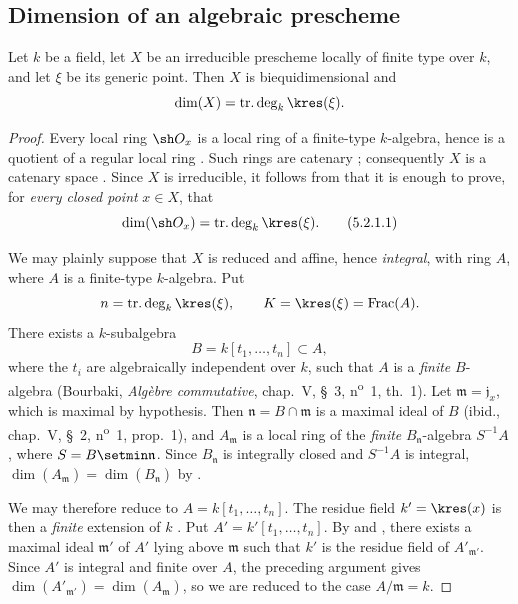 \subsection{Dimension of an algebraic prescheme}
\label{subsection:IV.5.2}


\begin{proposition}[5.2.1]
\label{IV.5.2.1}
Let $k$ be a field, let $X$ be an irreducible prescheme locally of
finite type over $k$, and let $\xi$ be its generic point.
Then $X$ is biequidimensional and
\[
\dim(X)=\operatorname{tr.deg}_k\kres(\xi).
\]
\end{proposition}

\begin{proof}
Every local ring $\sh O_x$ is a local ring of a finite-type
$k$-algebra, hence is a quotient of a regular local ring
.
Such rings are catenary ; consequently $X$ is a
catenary space .
Since $X$ is irreducible, it follows from  that it is
enough to prove, for \emph{every closed point} $x\in X$, that
\begin{equation}
\dim(\sh O_x)=\operatorname{tr.deg}_k\kres(\xi).
\tag{5.2.1.1}\label{IV.5.2.1.1}
\end{equation}

We may plainly suppose that $X$ is reduced and affine, hence \emph{integral},
with ring $A$, where $A$ is a finite-type $k$-algebra.
Put
\[
n=\operatorname{tr.deg}_k\kres(\xi),
\qquad K=\kres(\xi)=\operatorname{Frac}(A).
\]
There exists a $k$-subalgebra
\[
B=k[t_1,\ldots,t_n]\subset A,
\]
where the $t_i$ are algebraically independent over $k$, such that $A$
is a \emph{finite} $B$-algebra
(Bourbaki, \emph{Alg\`ebre commutative}, chap.~V, \S~3,
n\textsuperscript{o}~1, th.~1).
Let $\mathfrak m=\mathfrak j_x$, which is maximal by hypothesis.
Then $\mathfrak n=B\cap\mathfrak m$ is a maximal ideal of $B$
(ibid., chap.~V, \S~2, n\textsuperscript{o}~1, prop.~1), and
$A_{\mathfrak m}$ is a local ring of the \emph{finite}
$B_{\mathfrak n}$-algebra $S^{-1}A$, where
$S=B\setmin\mathfrak n$.
Since $B_{\mathfrak n}$ is integrally closed and $S^{-1}A$ is
integral, $\dim(A_{\mathfrak m})=\dim(B_{\mathfrak n})$
by .

We may therefore reduce to $A=k[t_1,\ldots,t_n]$.
The residue field $k'=\kres(x)$ is then a \emph{finite} extension of $k$
.
Put $A'=k'[t_1,\ldots,t_n]$.
By  and , there exists a maximal
ideal $\mathfrak m'$ of $A'$ lying above $\mathfrak m$ such that $k'$
is the residue field of $A'_{\mathfrak m'}$.
Since $A'$ is integral and finite over $A$, the preceding argument
gives $\dim(A'_{\mathfrak m'})=\dim(A_{\mathfrak m})$,
so we are reduced to the case $A/\mathfrak m=k$.


\end{proof}
